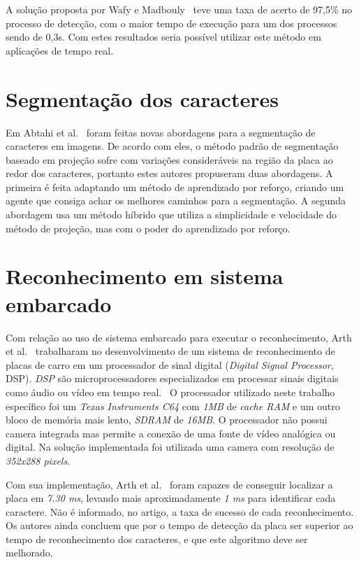 A solução proposta por Wafy e Madbouly~\cite{wafy2016efficient} teve uma taxa de acerto de 97,5\% no processo de detecção, com o maior tempo de execução para um dos processos sendo de
0,3s. Com estes resultados seria possível utilizar este método em aplicações de
tempo real.

\section{Segmentação dos caracteres}

Em Abtahi et al.~\cite{abtahi2015deep} foram feitas novas abordagens para a
segmentação de caracteres em imagens. De acordo com eles, o método padrão de
segmentação baseado em projeção sofre com variações consideráveis na região da
placa ao redor dos caracteres, portanto estes autores propuseram duas abordagens.
A primeira é feita adaptando um método de aprendizado por reforço, criando um agente que
consiga achar os melhores caminhos para a segmentação.  A segunda abordagem usa
um método híbrido que utiliza a simplicidade e velocidade do método de projeção,
mas com o poder do aprendizado por reforço.

\section{Reconhecimento em sistema embarcado}

Com relação ao uso de sistema embarcado para executar o reconhecimento, Arth et
al.~\cite{arth2007real} trabalharam no desenvolvimento de um sistema de reconhecimento
de placas de carro em um processador de sinal digital (\emph{Digital Signal Processor}, DSP).
\emph{DSP} são microprocessadores especializados em
processar sinais digitais como áudio ou vídeo em tempo real.~\cite{yovits1993advances} O processador utilizado
neste trabalho específico foi um \emph{Texas Instruments C64} com \emph{1MB} de \emph{cache RAM} e um outro bloco
de memória mais lento, \emph{SDRAM} de \emph{16MB}. O processador não possui camera integrada mas permite a conexão de
uma fonte de vídeo analógica ou digital. Na solução implementada foi utilizada uma camera com resolução de \emph{352x288 pixels}.

Com sua implementação, Arth et al.~\cite{arth2007real} foram capazes de conseguir localizar a placa em
\emph{7.30 ms}, levando mais aproximadamente \emph{1 ms} para identificar cada caractere. Não é informado, no artigo,
a taxa de sucesso de cada reconhecimento. Os autores ainda concluem que por o tempo de detecção da placa ser superior
ao tempo de reconhecimento dos caracteres, e que este algoritmo deve ser melhorado.

